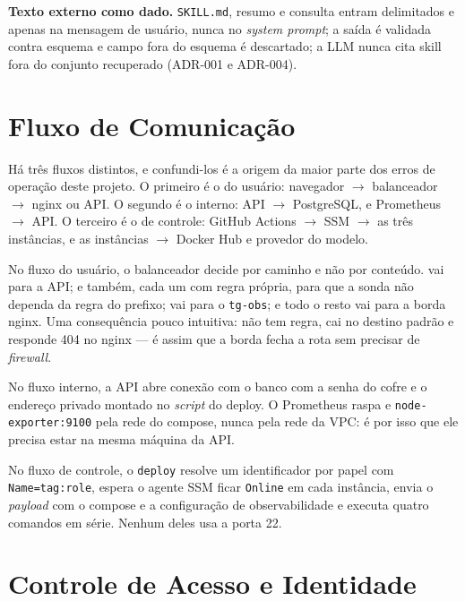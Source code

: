 \documentclass[11pt,a4paper]{article}
\begin{document}
\textbf{Texto externo como dado.} \texttt{SKILL.md}, resumo e consulta entram delimitados e apenas
na mensagem de usuário, nunca no \emph{system prompt}; a saída é validada contra esquema e campo
fora do esquema é descartado; a LLM nunca cita skill fora do conjunto recuperado (ADR-001 e ADR-004).

\section{Fluxo de Comunicação}

Há três fluxos distintos, e confundi-los é a origem da maior parte dos erros de operação deste
projeto. O primeiro é o do usuário: navegador $\rightarrow$ balanceador $\rightarrow$ nginx ou API.
O segundo é o interno: API $\rightarrow$ PostgreSQL, e Prometheus $\rightarrow$ API. O terceiro é o
de controle: GitHub Actions $\rightarrow$ SSM $\rightarrow$ as três instâncias, e as instâncias
$\rightarrow$ Docker Hub e provedor do modelo.

No fluxo do usuário, o balanceador decide por caminho e não por conteúdo.  vai para a
API;  e  também, cada um com regra própria, para que a sonda não
dependa da regra do prefixo;  vai para o \texttt{tg-obs}; e todo o resto vai para
a borda nginx. Uma consequência pouco intuitiva:  não tem regra, cai no destino
padrão e responde 404 no nginx --- é assim que a borda fecha a rota sem precisar de \emph{firewall}.

No fluxo interno, a API abre conexão com o banco com a senha do cofre e o endereço privado montado no
\emph{script} do deploy. O Prometheus raspa  e
\texttt{node-exporter:9100} pela rede do compose, nunca pela rede da VPC: é por isso que ele precisa
estar na mesma máquina da API.

No fluxo de controle, o \texttt{deploy} resolve um identificador por papel com
\texttt{Name=tag:role}, espera o agente SSM ficar \texttt{Online} em cada instância, envia o
\emph{payload} com o compose e a configuração de observabilidade e executa quatro comandos em série.
Nenhum deles usa a porta 22.

\section{Controle de Acesso e Identidade}
\end{document}
